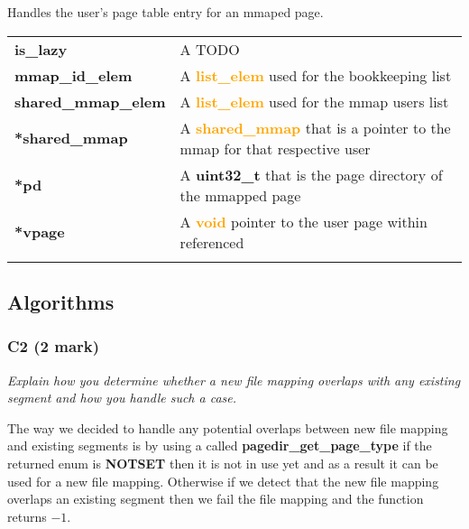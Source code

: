\documentclass{report}
\newcommand{\question}[1]{\textit{#1} \ }
\newcommand{\fun}[1]{\textcolor{Emerald}{\textbf{#1}}}
\newcommand{\file}[1]{\textcolor{YellowGreen}{\textbf{#1}}}
\newcommand{\struct}[1]{\textcolor{orange}{\textbf{#1}}}
\newcommand{\var}[1]{\textcolor{RoyalPurple}{\textbf{#1}}}
\newcommand{\const}[1]{\textcolor{BrickRed}{\textbf{#1}}}
\newcommand{\pintoscode}[4]{}
\newcommand{\pintosfile}[3]{\pintoscode{#1}{#2}{\file{#3}}{#3}}
\begin{document}
				\pintosfile{60}{67}{mmap.c}
				Handles the user's page table entry for an mmaped page. \\
				\begin{center}
					\begin{tabular}{l p{10cm}}
							\vspace*{2mm}
							\var{is\_lazy}            & A TODO \\ \vspace*{2mm}
							\var{mmap\_id\_elem}      & A \struct{list\_elem} used for the bookkeeping list \\ \vspace*{2mm}
							\var{shared\_mmap\_elem}  & A \struct{list\_elem} used for the mmap users list \\ \vspace*{2mm}
							\var{*shared\_mmap}       & A \struct{shared\_mmap} that is a pointer to the mmap for that respective user \\ \vspace*{2mm}
							\var{*pd}                 & A \const{uint32\_t} that is the page directory of the mmapped page \\ \vspace*{2mm}
							\var{*vpage}              & A \struct{void} pointer to the user page within referenced \\ \vspace*{2mm}
					\end{tabular}
				\end{center}

		\subsection*{Algorithms}
			\subsubsection*{C2 (2 mark)}
				\question{Explain how you determine whether a new file mapping overlaps 
				with any existing segment and how you handle such a case.}

				The way we decided to handle any potential overlaps between new file 
				mapping and existing segments is by using a called \fun{pagedir\_get\_page\_type}
				if the returned enum is \var{NOTSET} 
				then it is not in use yet and as a result it can be used for a new file mapping. 
				Otherwise if we detect that the new file mapping overlaps an existing segment then we 
				fail the file mapping and the function returns \const{$-1$}.
\end{document}
